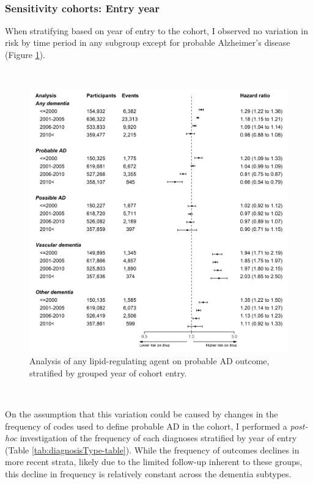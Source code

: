 \documentclass[a4paper, twoside]{templates/ociamthesis}
\begin{document}
~

\hypertarget{sensitivity-cohorts-entry-year}{%
\subsubsection{Sensitivity cohorts: Entry year}\label{sensitivity-cohorts-entry-year}}

When stratifying based on year of entry to the cohort, I observed no variation in risk by time period in any subgroup except for probable Alzheimer's disease (Figure \ref{fig:diagnosisTypeFig}).

~





\begin{figure}[H]
\includegraphics[width=1\linewidth]{figures/cprd-analysis/forester_cohort_entry} \caption[Sensitivity analysis: grouped year of entry]{Analysis of any lipid-regulating agent on probable AD outcome, stratified by grouped year of cohort entry.}\label{fig:diagnosisTypeFig}
\end{figure}

~

On the assumption that this variation could be caused by changes in the frequency of codes used to define probable AD in the cohort, I performed a \emph{post-hoc} investigation of the frequency of each diagnoses stratified by year of entry (Table \ref{tab:diagnosisType-table}). While the frequency of outcomes declines in more recent strata, likely due to the limited follow-up inherent to these groups, this decline in frequency is relatively constant across the dementia subtypes.
\end{document}
